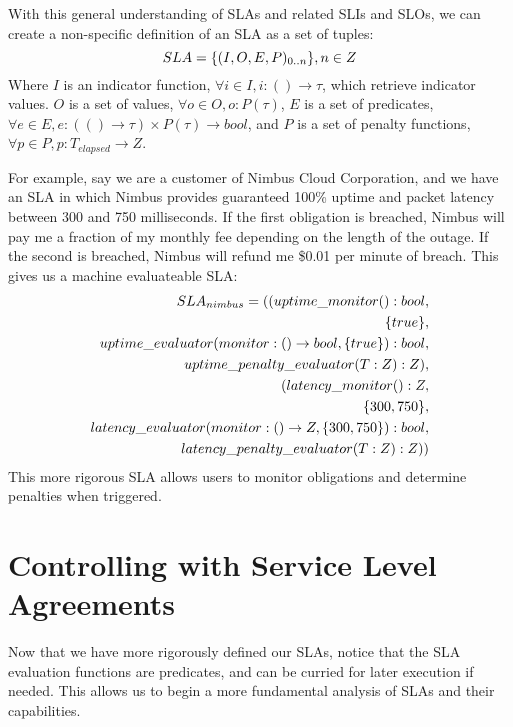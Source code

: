With this general understanding of SLAs and related SLIs and SLOs, we can create a non-specific definition of an SLA as a set of tuples:
\begin{equation}
SLA = \lbrace (I,O,E,P)_{0..n} \rbrace, n \in Z \\
\end{equation}
Where $ I $ is an indicator function, $ \forall i \in I, i : () \rightarrow \tau $, which retrieve indicator values.  $ O $ is a set of values, $ \forall o \in O, o : P(\tau) $, $ E $ is a set of predicates, $ \forall e \in E, e : ( () \rightarrow \tau ) \times P(\tau) \rightarrow bool $, and $ P $ is a set of penalty functions, $ \forall p \in P, p : T_{elapsed} \rightarrow Z $.

For example, say we are a customer of Nimbus Cloud Corporation, and we have an SLA in which Nimbus provides guaranteed 100\% uptime and packet latency between 300 and 750 milliseconds.  If the first obligation is breached, Nimbus will pay me a fraction of my monthly fee depending on the length of the outage.  If the second is breached, Nimbus will refund me \$0.01 per minute of breach.  This gives us a machine evaluateable SLA:
\begin{align}
SLA_{nimbus} = ( ( uptime\_monitor() : bool, \\
\lbrace true \rbrace, \notag \\
uptime\_evaluator( monitor : () \rightarrow bool, \lbrace true \rbrace) : bool, \notag \\
uptime\_penalty\_evaluator( T : Z ) : Z ), \notag \\
( latency\_monitor() : Z, \notag \\
\lbrace 300, 750 \rbrace, \notag \\
latency\_evaluator( monitor : () \rightarrow Z, \lbrace 300, 750 \rbrace) : bool, \notag \\
latency\_penalty\_evaluator( T : Z ) : Z) ) \notag
\end{align}
This more rigorous SLA allows users to monitor obligations and determine penalties when triggered.

\section{Controlling with Service Level Agreements}
Now that we have more rigorously defined our SLAs, notice that the SLA evaluation functions are predicates, and can be curried for later execution if needed.  This allows us to begin a more fundamental analysis of SLAs and their capabilities.

